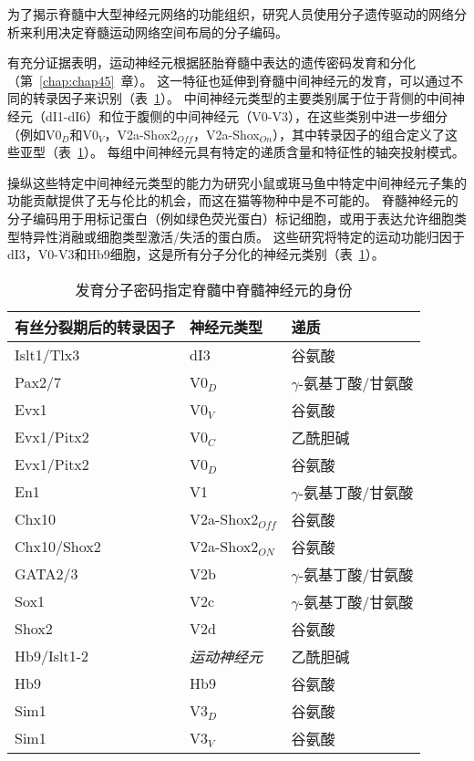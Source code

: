 \begin{proposition} \label{box:33_3}
	
	\quad \quad 为了揭示脊髓中大型神经元网络的功能组织，研究人员使用分子遗传驱动的网络分析来利用决定脊髓运动网络空间布局的分子编码。
	
	\quad \quad 有充分证据表明，运动神经元根据胚胎脊髓中表达的遗传密码发育和分化（第~\ref{chap:chap45}~章）。
	这一特征也延伸到脊髓中间神经元的发育，可以通过不同的转录因子来识别（表~\ref{tab:33_1}）。
	中间神经元类型的主要类别属于位于背侧的中间神经元（dI1-dI6）和位于腹侧的中间神经元（V0-V3），在这些类别中进一步细分（例如V0$_D$和V0$_V$，V2a-Shox2$_{Off}$，V2a-Shox$_{On}$），其中转录因子的组合定义了这些亚型（表~\ref{tab:33_1}）。
	每组中间神经元具有特定的递质含量和特征性的轴突投射模式。
	
	\quad \quad 操纵这些特定中间神经元类型的能力为研究小鼠或斑马鱼中特定中间神经元子集的功能贡献提供了无与伦比的机会，而这在猫等物种中是不可能的。
	脊髓神经元的分子编码用于用标记蛋白（例如绿色荧光蛋白）标记细胞，或用于表达允许细胞类型特异性消融或细胞类型激活/失活的蛋白质。
	这些研究将特定的运动功能归因于dI3，V0-V3和Hb9细胞，这是所有分子分化的神经元类别（表~\ref{tab:33_1}）。
	
\end{proposition}


\begin{table}[htbp]
	\caption{发育分子密码指定脊髓中脊髓神经元的身份} \label{tab:33_1} \centering
	\begin{tabular}{lll}
		\toprule
		有丝分裂期后的转录因子 & 神经元类型 & 递质 \\
		\midrule
		Islt1/Tlx3 & dI3 & 谷氨酸  \\
		Pax2/7 & V0$_D$ & $\gamma$-氨基丁酸/甘氨酸  \\
		Evx1 & V0$_V$ & 谷氨酸  \\
		Evx1/Pitx2 & V0$_C$ & 乙酰胆碱  \\
		Evx1/Pitx2 & V0$_D$ & 谷氨酸  \\
		En1 & V1 & $\gamma$-氨基丁酸/甘氨酸  \\
		Chx10 & V2a-Shox2$_{Off}$ & 谷氨酸  \\
		Chx10/Shox2 & V2a-Shox2$_{ON}$ & 谷氨酸  \\
		GATA2/3 & V2b & $\gamma$-氨基丁酸/甘氨酸  \\
		Sox1 & V2c & $\gamma$-氨基丁酸/甘氨酸  \\
		Shox2 & V2d & 谷氨酸  \\
		Hb9/Islt1-2 & \textit{运动神经元} & 乙酰胆碱  \\
		Hb9 & Hb9 & 谷氨酸  \\
		Sim1 & V3$_D$ & 谷氨酸  \\
		Sim1 & V3$_V$ & 谷氨酸  \\
		\bottomrule
	\end{tabular}
\end{table}


